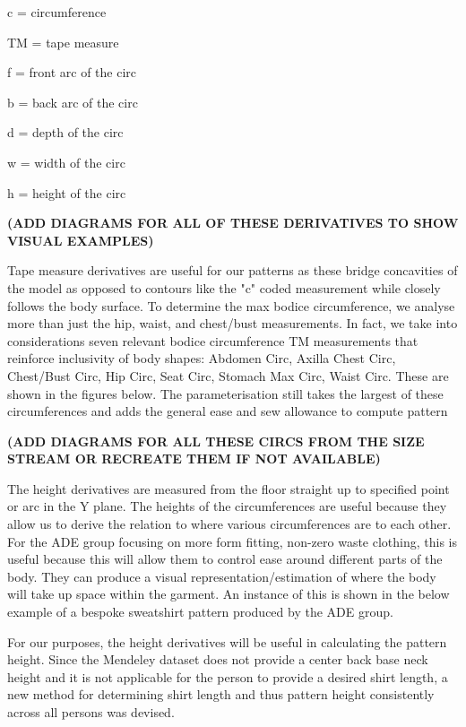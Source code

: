c = circumference

TM = tape measure

f = front arc of the circ

b = back arc of the circ

d = depth of the circ

w = width of the circ

h = height of the circ

\textbf{(ADD DIAGRAMS FOR ALL OF THESE DERIVATIVES TO SHOW VISUAL EXAMPLES)}

Tape measure derivatives are useful for our patterns as these bridge concavities of the model as opposed to contours like the "c" coded measurement while closely follows the body surface. To determine the max bodice circumference, we analyse more than just the hip, waist, and chest/bust measurements. In fact, we take into considerations seven relevant bodice circumference TM measurements that reinforce inclusivity of body shapes: Abdomen Circ, Axilla Chest Circ, Chest/Bust Circ, Hip Circ, Seat Circ, Stomach Max Circ, Waist Circ. These are shown in the figures below. The parameterisation still takes the largest of these circumferences and adds the general ease and sew allowance to compute pattern 

\textbf{(ADD DIAGRAMS FOR ALL THESE CIRCS FROM THE SIZE STREAM OR RECREATE THEM IF NOT AVAILABLE)}

The height derivatives are measured from the floor straight up to specified point or arc in the Y plane. The heights of the circumferences are useful because they allow us to derive the relation to where various circumferences are to each other. For the ADE group focusing on more form fitting, non-zero waste clothing, this is useful because this will allow them to control ease around different parts of the body. They can produce a visual representation/estimation of where the body will take up space within the garment. An instance of this is shown in the below example of a bespoke sweatshirt pattern produced by the ADE group. 

For our purposes, the height derivatives will be useful in calculating the pattern height. Since the Mendeley dataset does not provide a center back base neck height and it is not applicable for the person to provide a desired shirt length, a new method for determining shirt length and thus pattern height consistently across all persons was devised.

